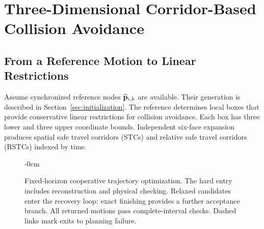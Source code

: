 \section{Three-Dimensional Corridor-Based Collision Avoidance}
\label{sec:corridor}
\subsection{From a Reference Motion to Linear Restrictions}
Assume synchronized reference nodes $\widehat{\mathbf{p}}_{i,k}$ are available. Their generation is described in Section~\ref{sec:initialization}. The reference determines local boxes that provide conservative linear restrictions for collision avoidance. Each box has three lower and three upper coordinate bounds. Independent six-face expansion produces spatial safe travel corridors (STCs) and relative safe travel corridors (RSTCs) indexed by time.
\begin{figure}[htbp]
\begin{adjustwidth}{-\extralength}{0cm}
\centering\resizebox{\fulllength}{!}{}
\caption{Fixed-horizon cooperative trajectory optimization. The hard entry includes reconstruction and physical checking. Relaxed candidates enter the recovery loop; exact finishing provides a further acceptance branch. All returned motions pass complete-interval checks. Dashed links mark exits to planning failure.\label{fig:framework}}
\end{adjustwidth}
\end{figure}


